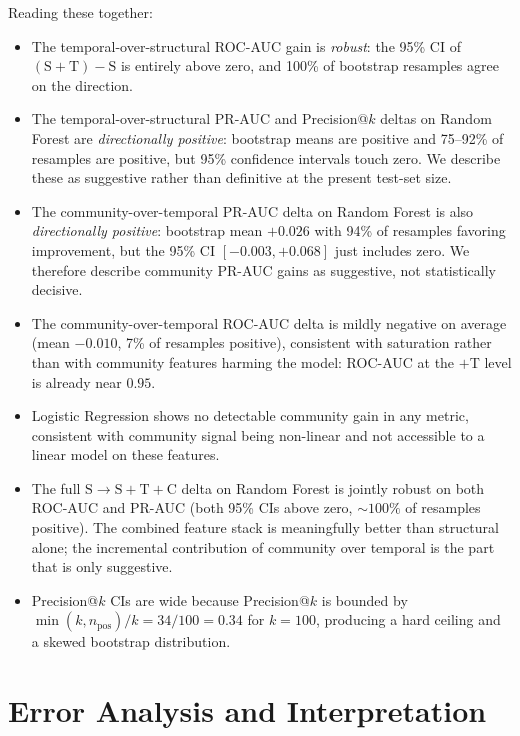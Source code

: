 \documentclass[conference]{IEEEtran}
\begin{document}
Reading these together:
\begin{itemize}
\item The temporal-over-structural ROC-AUC gain is \emph{robust}: the
95\% CI of $(\mathrm{S}{+}\mathrm{T}) - \mathrm{S}$ is entirely above
zero, and 100\% of bootstrap resamples agree on the direction.
\item The temporal-over-structural PR-AUC and Precision@$k$ deltas on
Random Forest are \emph{directionally positive}: bootstrap means are
positive and 75--92\% of resamples are positive, but 95\% confidence
intervals touch zero. We describe these as suggestive rather than
definitive at the present test-set size.
\item The community-over-temporal PR-AUC delta on Random Forest is
also \emph{directionally positive}: bootstrap mean $+0.026$ with 94\%
of resamples favoring improvement, but the 95\% CI $[-0.003, +0.068]$
just includes zero. We therefore describe community PR-AUC gains as
suggestive, not statistically decisive.
\item The community-over-temporal ROC-AUC delta is mildly negative
on average (mean $-0.010$, 7\% of resamples positive), consistent with
saturation rather than with community features harming the model:
ROC-AUC at the $+$T level is already near $0.95$.
\item Logistic Regression shows no detectable community gain in any
metric, consistent with community signal being non-linear and not
accessible to a linear model on these features.
\item The full $\mathrm{S} \to \mathrm{S}{+}\mathrm{T}{+}\mathrm{C}$
delta on Random Forest is jointly robust on both ROC-AUC and PR-AUC
(both 95\% CIs above zero, $\sim 100\%$ of resamples positive). The
combined feature stack is meaningfully better than structural alone;
the incremental contribution of community over temporal is the part
that is only suggestive.
\item Precision@$k$ CIs are wide because Precision@$k$ is bounded by
$\min(k, n_{\mathrm{pos}})/k = 34/100 = 0.34$ for $k = 100$,
producing a hard ceiling and a skewed bootstrap distribution.
\end{itemize}

\section{Error Analysis and Interpretation}
\end{document}
